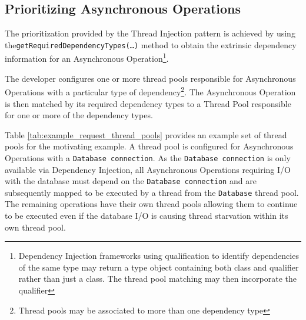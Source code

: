\documentclass[prodmode]{style/acmlarge}
\begin{document}
\subsection{Prioritizing Asynchronous Operations}

The prioritization provided by the Thread Injection pattern is achieved by using
the\texttt{getRequiredDependencyTypes(\ldots)} method to obtain the extrinsic
dependency information for an Asynchronous Operation\footnote{Dependency
Injection frameworks using qualification to identify dependencies of the same
type may return a type object containing both class and qualifier rather than
just a class.  The thread pool matching may then incorporate the qualifier}.

The developer configures one or more thread pools responsible for Asynchronous
Operations with a particular type of dependency\footnote{Thread pools may be
associated to more than one dependency type}.  The Asynchronous Operation is
then matched by its required dependency types to a Thread Pool responsible for
one or more of the dependency types. 

Table \ref{tab:example_request_thread_pools} provides an example set of thread
pools for the motivating example.  A thread pool is configured for Asynchronous
Operations with a \texttt{Database connection}.  As the \texttt{Database
connection} is only available via Dependency Injection, all Asynchronous
Operations requiring I/O with the database must depend on the \texttt{Database
connection} and are subsequently mapped to be executed by a thread from the
\texttt{Database} thread pool.  The remaining operations have their own thread
pools allowing them to continue to be executed even if the database I/O is
causing thread starvation within its own thread pool.

\begin{table}[t]
\label{tab:example_request_thread_pools}
\end{table}
\end{document}
